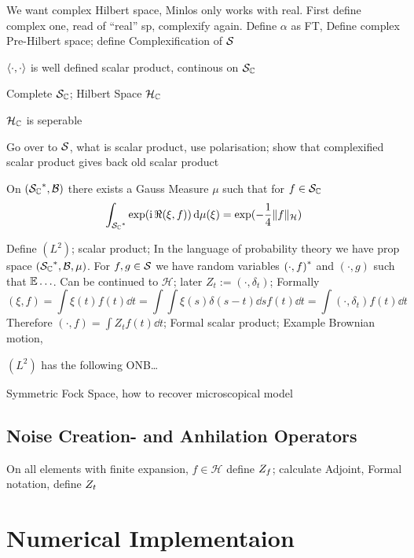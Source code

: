 We want complex Hilbert space, Minlos only works with real. First define complex one, read of ``real'' sp, complexify again. Define $\alpha$ as FT, Define complex Pre-Hilbert space; define Complexification of $\SchwartzS$
\begin{lem}
  $\sp{\cdot}{\cdot}$ is well defined scalar product, continous on $\SchwartzS_\Complex$
\end{lem}
Complete $\SchwartzS_\Complex$; Hilbert Space $\mathcal{H}_\Complex$
\begin{lem}
  $\mathcal{H}_\Complex$ is seperable
\end{lem}

Go over to $\SchwartzS$, what is scalar product, use polarisation; show that complexified scalar product gives back old scalar product
\begin{thm} \label{thm:mp_existence}
  On $(\dual{\mathcal{S}_\Complex}, \mathcal{B})$ there exists a Gauss Measure $\mu$ such that for $f \in \SchwartzS_\Complex$
  \begin{equation}
    \label{eq:mp_fourier_gauss}
    \int_{\dual{\SchwartzS_\Complex}} \exp{\left(\ii \, \Re(\xi, f)\right)} \dd\mu(\xi) = \exp(-\frac{1}{4} \Vert f \Vert_\mathcal{H})
  \end{equation}
\end{thm}

Define $(L^2)$; scalar product; In the language of probability theory we have prop space $(\dual{\SchwartzS_\Complex}, \mathcal{B}, \mu)$. For $f,g \in \SchwartzS$ we have random variables $\cc{(\cdot, f)}$ and $(\cdot, g)$ such that $\E \ldots$. Can be continued to $\mathcal{H}$; later $Z_t := (\cdot, \delta_t)$; Formally
  \begin{equation*}
  (\xi, f) = \int \xi(t) f(t) \dd t = \int \int \xi(s) \delta(s-t) \dd s f(t) \dd t = \int (\cdot, \delta_t) f(t) \dd t
  \end{equation*}
Therefore $(\cdot, f) = \int Z_t f(t) \dd t$; Formal scalar product; Example Brownian motion,

  \begin{thm} \label{thm:mp_expansion}
  $(L^2)$ has the following ONB\dots
  \end{thm}
Symmetric Fock Space, how to recover microscopical model


\section{Noise Creation- and Anhilation Operators}
\label{sec:math.operators}

On all elements with finite expansion, $f \in \mathcal{H}$ define $\op Z_f$; calculate Adjoint, Formal notation, define $\op Z_t$




\chapter{Numerical Implementaion}
\label{cha:implement}
